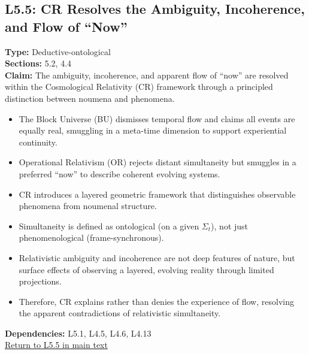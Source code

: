 \documentclass[12pt]{book}
\newcommand{\returnlink}[1]{\hyperref[logic:#1]{Return to #1 in main text}\xspace}
\begin{document}
\subsection*{L5.5: CR Resolves the Ambiguity, Incoherence, and Flow of ``Now''}
\label{appendix:L5.5}
\textbf{Type:} Deductive-ontological \\
\textbf{Sections:} 5.2, 4.4 \\
\textbf{Claim:} The ambiguity, incoherence, and apparent flow of ``now'' are resolved within the Cosmological Relativity (CR) framework through a principled distinction between noumena and phenomena.
\begin{itemize}
  \item The Block Universe (BU) dismisses temporal flow and claims all events are equally real, smuggling in a meta-time dimension to support experiential continuity.
  \item Operational Relativism (OR) rejects distant simultaneity but smuggles in a preferred ``now'' to describe coherent evolving systems.
  \item CR introduces a layered geometric framework that distinguishes observable phenomena from noumenal structure.
  \item Simultaneity is defined as ontological (on a given $\Sigma_t$), not just phenomenological (frame-synchronous).
  \item Relativistic ambiguity and incoherence are not deep features of nature, but surface effects of observing a layered, evolving reality through limited projections.
  \item Therefore, CR explains rather than denies the experience of flow, resolving the apparent contradictions of relativistic simultaneity.
\end{itemize}
\textbf{Dependencies:} L5.1, L4.5, L4.6, L4.13 \\
\returnlink{L5.5}
\end{document}
